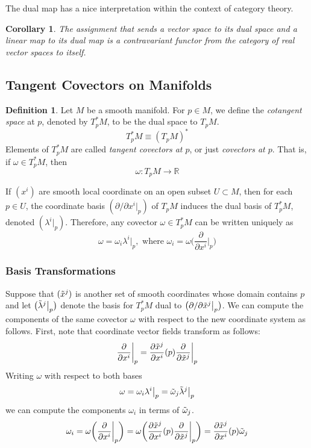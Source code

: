 \documentclass{article}
\newtheorem{corollary}{Corollary}[theorem]
\theoremstyle{remark}
\theoremstyle{definition}
\newtheorem{definition}{Definition}[section]
\begin{document}
The dual map has a nice interpretation within the context of category theory.

\begin{corollary}
The assignment that sends a vector space to its dual space and a linear map to its dual map is a contravariant functor from the category of real vector spaces to itself. 
\end{corollary}

\subsection{Tangent Covectors on Manifolds}

\begin{definition}
Let $M$ be a smooth manifold. For $p \in M$, we define the \textit{cotangent space} at $p$, denoted by $T_p^* M$, to be the dual space to $T_p M$. 
\[T_p^* M \equiv (T_p M)^*\]
Elements of $T_p^* M$ are called \textit{tangent covectors at $p$}, or just \textit{covectors at $p$}. That is, if $\omega \in T_p^* M$, then 
\[\omega: T_p M \longrightarrow \mathbb{R}\]
\end{definition}

If $(x^i)$ are smooth local coordinate on an open subset $U \subset M$, then for each $p \in U$, the coordinate basis $(\partial/\partial x^i |_p )$ of $T_p M$ induces the dual basis of $T_p^* M$, denoted $(\lambda^i |_p)$. Therefore, any covector $\omega \in T_p^* M$ can be written uniquely as 
\[\omega = \omega_i \lambda^i \big|_p, \text{ where } \omega_i = \omega \bigg( \frac{\partial}{\partial x^i} \bigg|_p \bigg)\]

\subsubsection{Basis Transformations}
Suppose that $(\Tilde{x}^j)$ is another set of smooth coordinates whose domain contains $p$ and let $\big( \Tilde{\lambda}^j \big|_p\big)$ denote the basis for $T_p^* M$ dual to $\big(\partial /\partial \Tilde{x}^j \big|_p \big)$. We can compute the components of the same covector $\omega$ with respect to the new coordinate system as follows. First, note that coordinate vector fields transform as follows: 
\[\frac{\partial}{\partial x^i} \bigg|_p = \frac{\partial \Tilde{x}^j}{\partial x^i} (p) \frac{\partial}{\partial \Tilde{x}^j} \bigg|_p\]
Writing $\omega$ with respect to both bases 
\[\omega = \omega_i \lambda^i \big|_p = \Tilde{\omega}_j \Tilde{\lambda}^j \big|_p\]
we can compute the components $\omega_i$ in terms of $\Tilde{\omega}_j$. 
\[\omega_i = \omega \bigg( \frac{\partial}{\partial x^i} \bigg|_p \bigg) = \omega \bigg( \frac{\partial \Tilde{x}^j}{\partial x^i} (p) \frac{\partial}{\partial \Tilde{x}^j} \bigg|_p \bigg) = \frac{\partial \Tilde{x}^j}{\partial x^i} (p) \Tilde{\omega}_j\]
\end{document}
